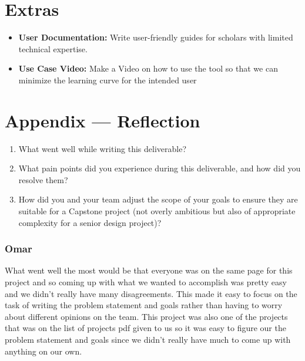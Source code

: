 \documentclass{article}
\begin{document}
\section{Extras}
\begin{itemize}
  \item \textbf{User Documentation:} Write user-friendly guides for scholars with limited technical expertise.
  \item \textbf{Use Case Video:} Make a Video on how to use the tool so that we can minimize the learning curve for the intended user
\end{itemize}


\newpage{}

\section*{Appendix --- Reflection}




\begin{enumerate}
    \item What went well while writing this deliverable? 
    \item What pain points did you experience during this deliverable, and how
    did you resolve them?
    \item How did you and your team adjust the scope of your goals to ensure
    they are suitable for a Capstone project (not overly ambitious but also of
    appropriate complexity for a senior design project)?
\end{enumerate}  



\subsubsection*{Omar}
\hspace{2em} What went well the most would be that everyone was on the same page for this project and so coming up with what we wanted to accomplish was pretty easy and we didn't really have many disagreements. This made it easy to focus on the task of writing the problem statement and goals rather than having to worry about different opinions on the team. This project was also one of the projects that was on the list of projects pdf given to us so it was easy to figure our the problem statement and goals since we didn't really have much to come up with anything on our own. 
\end{document}
